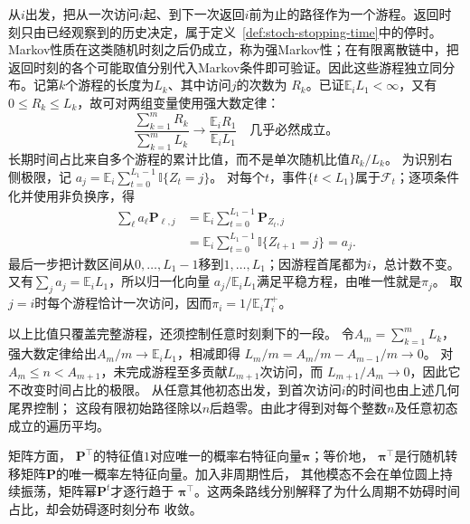 从$i$出发，把从一次访问$i$起、到下一次返回$i$前为止的路径作为一个游程。返回时刻只由已经观察到的历史决定，属于定义~\ref{def:stoch-stopping-time}中的停时。Markov性质在这类随机时刻之后仍成立，称为强Markov性；在有限离散链中，把返回时刻的各个可能取值分别代入Markov条件即可验证。因此这些游程独立同分布。记第$k$个游程的长度为$L_k$、其中访问$j$的次数为
$R_k$。已证$\mathbb E_iL_1<\infty$，又有$0\leq R_k\leq L_k$，故可对两组变量使用强大数定律：
\[
  \frac{\sum_{k=1}^{m}R_k}{\sum_{k=1}^{m}L_k}
  \longrightarrow
  \frac{\mathbb{E}_iR_1}{\mathbb{E}_iL_1}
  \quad\text{几乎必然成立。}
\]
长期时间占比来自多个游程的累计比值，而不是单次随机比值$R_k/L_k$。
为识别右侧极限，记
$a_j=\mathbb E_i\sum_{t=0}^{L_1-1}\mathbb I\{Z_t=j\}$。
对每个$t$，事件$\{t<L_1\}$属于$\mathcal F_t$；逐项条件化并使用非负换序，得
\[
\begin{aligned}
 \sum_\ell a_\ell\bm P_{\ell,j}
 &=\mathbb E_i\sum_{t=0}^{L_1-1}\bm P_{Z_t,j}\\
 &=\mathbb E_i\sum_{t=0}^{L_1-1}\mathbb I\{Z_{t+1}=j\}
 =a_j.
\end{aligned}
\]
最后一步把计数区间从$0,\ldots,L_1-1$移到$1,\ldots,L_1$；因游程首尾都为$i$，总计数不变。
又有$\sum_j a_j=\mathbb E_iL_1$，所以归一化向量
$a_j/\mathbb E_iL_1$满足平稳方程，由唯一性就是$\pi_j$。
取$j=i$时每个游程恰计一次访问，因而$\pi_i=1/\mathbb E_iT_i^+$。

以上比值只覆盖完整游程，还须控制任意时刻剩下的一段。
令$A_m=\sum_{k=1}^mL_k$，强大数定律给出$A_m/m\to\mathbb E_iL_1$，相减即得
$L_m/m=A_m/m-A_{m-1}/m\to0$。
对$A_m\leq n<A_{m+1}$，未完成游程至多贡献$L_{m+1}$次访问，而
$L_{m+1}/A_m\to0$，因此它不改变时间占比的极限。
从任意其他初态出发，到首次访问$i$的时间也由上述几何尾界控制；
这段有限初始路径除以$n$后趋零。由此才得到对每个整数$n$及任意初态成立的遍历平均。

矩阵方面，
$\bm{P}^{\top}$的特征值$1$对应唯一的概率右特征向量$\bm{\pi}$；等价地，
$\bm{\pi}^{\top}$是行随机转移矩阵$\bm{P}$的唯一概率左特征向量。加入非周期性后，
其他模态不会在单位圆上持续振荡，矩阵幂$\bm{P}^t$才逐行趋于
$\bm{\pi}^{\top}$。这两条路线分别解释了为什么周期不妨碍时间占比，却会妨碍逐时刻分布
收敛。

